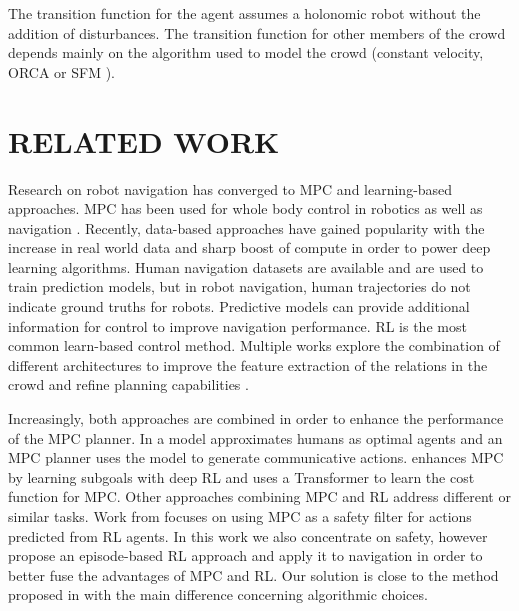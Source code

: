 \documentclass[letterpaper,conference,10pt]{IEEEconf}
\begin{document}
The transition function for the agent assumes a holonomic robot without the addition of disturbances. The transition function for other members of the crowd depends mainly on the algorithm used to model the crowd (constant velocity, ORCA \cite{berg_optimal_2011} or SFM \cite{helbing_social_1995}).


\section{RELATED WORK}\label{sec:rel_work}

Research on robot navigation has converged to MPC and learning-based approaches. MPC has been used for whole body control in robotics as well as navigation \cite{wieber_viability_2008,ciocca_time_2023}. Recently, data-based approaches have gained popularity with the increase in real world data and sharp boost of compute in order to power deep learning algorithms. Human navigation datasets are available and are used to train prediction models, but in robot navigation, human trajectories do not indicate ground truths for robots. Predictive models \cite{alahi_2016_CVPR} can provide additional information for control to improve navigation performance. RL is the most common learn-based control method. Multiple works explore the combination of different architectures to improve the feature extraction of the relations in the crowd and refine planning capabilities \cite{chen_2017,chen_crowd-robot_2019,everett_collision_2021}.

Increasingly, both approaches are combined in order to enhance the performance of the MPC planner. In \cite{che_efficient_2020} a model approximates humans as optimal agents and an MPC planner uses the model to generate communicative actions. \cite{brito_where_2021} enhances MPC by learning subgoals with deep RL and \cite{xiao_motion_2022} uses a Transformer to learn the cost function for MPC. Other approaches combining MPC and RL address different or similar tasks. Work from \cite{hewing_learning-based_2020,tearle_predictive_2021,mesbah_fusion_2022} focuses on using MPC as a safety filter for actions predicted from RL agents. In this work we also concentrate on safety, however propose an episode-based RL approach and apply it to navigation in order to better fuse the advantages of MPC and RL. Our solution is close to the method proposed in \cite{kicki_bridging_2024} with the main difference concerning algorithmic choices.
\end{document}
